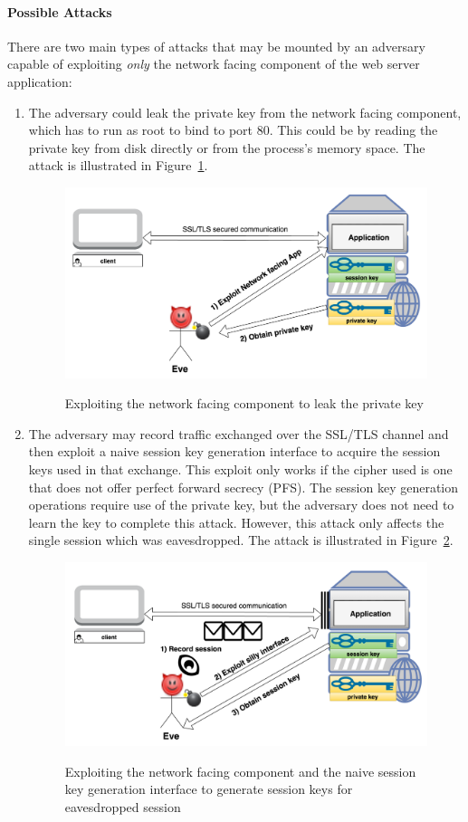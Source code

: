 \documentclass[../main.tex]{subfiles}
\begin{document}
	\paragraph{Possible Attacks} There are two main types of attacks that may be mounted by an adversary capable of exploiting \textit{only} the network facing component of the web server application:
	\begin{enumerate}
		\item The adversary could leak the private key from the network facing component, which has to run as root to bind to port 80. This could be by reading the private key from disk directly or from the process's memory space. The attack is illustrated in Figure~\ref{fig:attack1}.

		\begin{figure}[H]
			\centering
			\includegraphics[scale=0.15]{images/attack1.png}
			\label{fig:attack1}
			\caption{Exploiting the network facing component to leak the private key}
		\end{figure}

		\item The adversary may record traffic exchanged over the SSL/TLS channel and then exploit a naive session key generation interface to acquire the session keys used in that exchange. This exploit only works if the cipher used is one that does not offer perfect forward secrecy (PFS). The session key generation operations require use of the private key, but the adversary does not need to learn the key to complete this attack. However, this attack only affects the single session which was eavesdropped. The attack is illustrated in Figure~\ref{fig:attack2}.

		\begin{figure}[H]
			\centering
			\includegraphics[scale=0.15]{images/attack2.png}
			\label{fig:attack2}
			\caption{Exploiting the network facing component and the naive session key generation interface to generate session keys for eavesdropped session}
		\end{figure}
	\end{enumerate}
\end{document}
